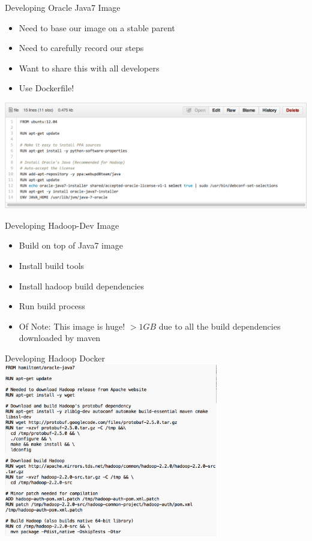 \documentclass[xcolor=dvipsnames]{beamer}
\newcommand{\cpause}{}
\begin{document}
\begin{frame}{Developing Oracle Java7 Image}
  
  \begin{itemize}
    \item Need to base our image on a stable parent \cpause
    \item Need to carefully record our steps \cpause
    \item Want to share this with all developers \cpause
    \item Use Dockerfile! \cpause
  \end{itemize}

\end{frame}

\begin{frame}
  \includegraphics[width=\textwidth]{figures/dockerfile-java.png}
\end{frame}


\begin{frame}{Developing Hadoop-Dev Image}
  
  \begin{itemize}
    \item Build on top of Java7 image \cpause
    \item Install build tools \cpause
    \item Install hadoop build dependencies \cpause
    \item Run build process \cpause
    \item Of Note: This image is huge! $>1GB$ due to all the build 
    dependencies downloaded by maven \cpause
  \end{itemize}

\end{frame}

\begin{frame}{Developing Hadoop Docker}
  \centering
  \includegraphics[width=0.7\textwidth]{figures/hadoop-dev.png}
\end{frame}
\end{document}
